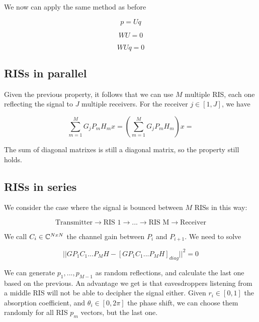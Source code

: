 We now can apply the same method as before

\begin{equation}p = Uq\end{equation}

\begin{equation}WU = 0\end{equation}

\begin{equation}WUq = 0\end{equation}

\subsection{RISs in parallel}

Given the previous property, it follows that we can use $M$ multiple RIS, each one reflecting the signal to $J$ multiple receivers. For the receiver $j \in [1, J]$, we have

\begin{equation}
  \sum_{m=1}^M G_j P_m H_m x = (\sum_{m=1}^M G_j P_m H_m) x =
\end{equation}

The sum of diagonal matrixes is still a diagonal matrix, so the property still holds.

\subsection{RISs in series}

We consider the case where the signal is bounced between $M$ RISs in this way:

\begin{equation}
  \text{Transmitter} \rightarrow \text{RIS 1} \rightarrow ... \rightarrow \text{RIS M} \rightarrow \text{Receiver}
\end{equation}

We call $C_i \in \mathbb{C}^{NxN}$ the channel gain between $P_i$ and $P_{i+1}$. We need to solve

\begin{equation}
  || GP_1C_1...P_MH - [GP_1C_1...P_MH]_{diag} || ^2 = 0
\end{equation}

We can generate $p_1, ..., p_{M-1}$ as random reflections, and calculate the last one based on the previous. An advantage we get is that eavesdroppers listening from a middle RIS will not be able to decipher the signal either. Given $r_i \in [0, 1]$ the absorption coefficient, and $\theta_i \in [0, 2\pi]$ the phase shift, we can choose them randomly for all RIS $p_m$ vectors, but the last one.

